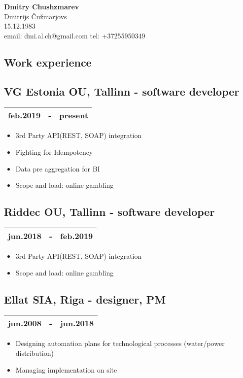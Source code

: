 \documentclass[10pt]{article}
\begin{document}
\begingroup
\centering
\LARGE \textbf{Dmitry Chushzmarev}\\
\large Dmitrijs Čužmarjovs\\
\large 15.12.1983\\
\large email: dmi.al.ch@gmail.com tel: +37255950349\\
\endgroup
\vspace{0.25em}

\begin{multicols*}{2}
\section*{Work experience}
\subsection*{VG Estonia OU, \textmd{Tallinn} - \textmd{software developer}}
\begin{tabular}{lll}
    feb.2019 & - & present\\
    \hline
\end{tabular}
\begin{itemize}
    \item 3rd Party API(REST, SOAP) integration
    \item Fighting for Idempotency
    \item Data pre aggregation for BI
    \item Scope and load: online gambling
\end{itemize}
\subsection*{Riddec OU, \textmd{Tallinn} - \textmd{software developer}}
\begin{tabular}{lll}
    jun.2018 & - & feb.2019\\
    \hline
\end{tabular}
\begin{itemize}
    \item 3rd Party API(REST, SOAP) integration
    \item Scope and load: online gambling
\end{itemize}
\subsection*{Ellat SIA, \textmd{Riga} - \textmd{designer, PM}}
\begin{tabular}{lll}
    jun.2008 & - & jun.2018\\
    \hline
\end{tabular}
\begin{itemize}
    \item Designing automation plans for technological processes (water/power distribution)
    \item Managing implementation on site
\end{itemize}

\end{multicols*}
\end{document}
